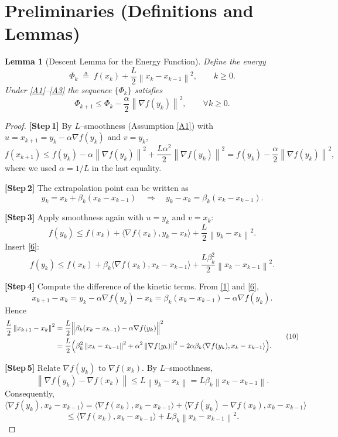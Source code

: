 \documentclass{article}
\newtheorem{lemma}{Lemma}
\newcommand{\grad}{\nabla}
\newcommand{\norm}[1]{\left\|#1\right\|}
\newcommand{\inner}[2]{\langle #1,#2\rangle}
\begin{document}
\section*{Preliminaries (Definitions and Lemmas)}
\begin{lemma}[Descent Lemma for the Energy Function]\label{lem:descent}
Define the energy
\[
\Phi_k\;\triangleq\;f(x_k)+\frac{L}{2}\norm{x_k-x_{k-1}}^{2},\qquad k\ge0.
\]
Under \ref{A1}–\ref{A3} the sequence $\{\Phi_k\}$ satisfies
\[
\Phi_{k+1}\le \Phi_k-\frac{\alpha}{2}\norm{\grad f(y_k)}^{2},
\qquad\forall k\ge0.
\tag{4}
\]
\end{lemma}
\begin{proof}
\textbf{[Step 1]} By $L$–smoothness (Assumption \ref{A1}) with $u=x_{k+1}=y_k-\alpha\grad f(y_k)$ and $v=y_k$,
\[
f(x_{k+1})\le f(y_k)-\alpha\norm{\grad f(y_k)}^{2}
+\frac{L\alpha^{2}}{2}\norm{\grad f(y_k)}^{2}
= f(y_k)-\frac{\alpha}{2}\norm{\grad f(y_k)}^{2},
\tag{5}
\]
where we used $\alpha=1/L$ in the last equality.

\textbf{[Step 2]} The extrapolation point can be written as
\[
y_k = x_k+\beta_k (x_k-x_{k-1})
\quad\Longrightarrow\quad
y_k-x_k = \beta_k (x_k-x_{k-1}).
\tag{6}
\]

\textbf{[Step 3]} Apply smoothness again with $u=y_k$ and $v=x_k$:
\[
f(y_k)\le f(x_k)+\inner{\grad f(x_k)}{y_k-x_k}
+\frac{L}{2}\norm{y_k-x_k}^{2}.
\tag{7}
\]
Insert \eqref{6}:
\[
f(y_k)\le f(x_k)+\beta_k\inner{\grad f(x_k)}{x_k-x_{k-1}}
+\frac{L\beta_k^{2}}{2}\norm{x_k-x_{k-1}}^{2}.
\tag{8}
\]

\textbf{[Step 4]} Compute the difference of the kinetic terms.
From \eqref{1} and \eqref{6},
\[
x_{k+1}-x_{k}=y_k-\alpha\grad f(y_k)-x_k
= \beta_k (x_k-x_{k-1})-\alpha\grad f(y_k).
\tag{9}
\]
Hence
\[
\begin{aligned}
\frac{L}{2}\norm{x_{k+1}-x_{k}}^{2}
&=\frac{L}{2}\Bigl\|\beta_k (x_k-x_{k-1})-\alpha\grad f(y_k)\Bigr\|^{2}\\
&=\frac{L}{2}\Bigl(\beta_k^{2}\norm{x_k-x_{k-1}}^{2}
+\alpha^{2}\norm{\grad f(y_k)}^{2}
-2\alpha\beta_k\inner{\grad f(y_k)}{x_k-x_{k-1}}\Bigr).
\end{aligned}
\tag{10}
\]

\textbf{[Step 5]} Relate $\grad f(y_k)$ to $\grad f(x_k)$.  
By $L$–smoothness,
\[
\norm{\grad f(y_k)-\grad f(x_k)}\le L\norm{y_k-x_k}=L\beta_k\norm{x_k-x_{k-1}}.
\tag{11}
\]
Consequently,
\[
\inner{\grad f(y_k)}{x_k-x_{k-1}}
= \inner{\grad f(x_k)}{x_k-x_{k-1}}
+ \inner{\grad f(y_k)-\grad f(x_k)}{x_k-x_{k-1}}
\]
\[
\le \inner{\grad f(x_k)}{x_k-x_{k-1}}
+ L\beta_k\norm{x_k-x_{k-1}}^{2}.
\tag{12}
\]


\end{proof}
\end{document}
